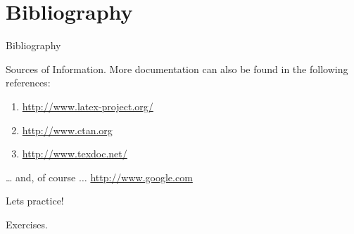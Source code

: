 

\section{Bibliography}
\begin{frame}{Bibliography}
\footnotesize
  \nocite{*}
  
  
\end{frame}

\begin{frame}{Sources of Information.}
More documentation can also be found in the following references:
\begin{enumerate}
\item \url{http://www.latex-project.org/}
\item \url{http://www.ctan.org}
\item \url{http://www.texdoc.net/}
\end{enumerate}
\ldots
and, of course $\ldots$ \pause \url{http://www.google.com}
\end{frame}


\begin{frame}{Lets practice!}
 \begin{center}
   \huge Exercises. 
 \end{center}
\end{frame}

